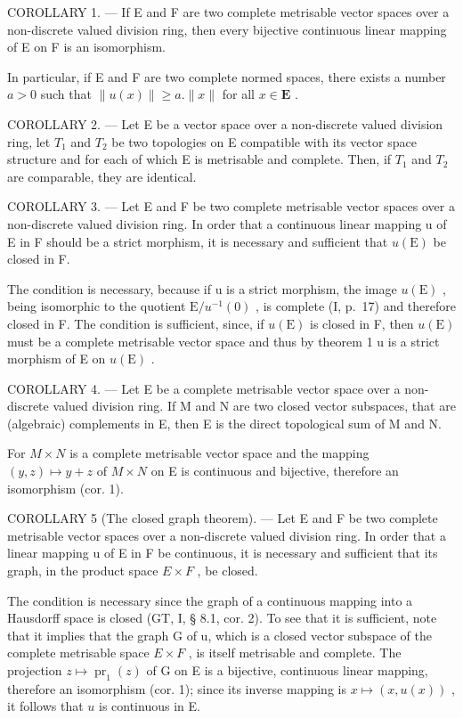COROLLARY 1. --- If E and F are two complete metrisable vector spaces over a non-discrete valued division ring, then every bijective continuous linear mapping of E on F is an isomorphism.

In particular, if E and F are two complete normed spaces, there exists a number \(a > 0\) such that \(\| u(x)\| \geqslant a.\| x\|\) for all \(x\in \mathbf{E}\) .

COROLLARY 2. --- Let E be a vector space over a non-discrete valued division ring, let \(T_{1}\) and \(T_{2}\) be two topologies on E compatible with its vector space structure and for each of which E is metrisable and complete. Then, if \(T_{1}\) and \(T_{2}\) are comparable, they are identical.

COROLLARY 3. --- Let E and F be two complete metrisable vector spaces over a non-discrete valued division ring. In order that a continuous linear mapping u of E in F should be a strict morphism, it is necessary and sufficient that \(u(\mathrm{E})\) be closed in F.

The condition is necessary, because if u is a strict morphism, the image \(u(\mathrm{E})\) , being isomorphic to the quotient \(\mathrm{E}/u^{-1}(0)\) , is complete (I, p.~17) and therefore closed in F. The condition is sufficient, since, if \(u(\mathrm{E})\) is closed in F, then \(u(\mathrm{E})\) must be a complete metrisable vector space and thus by theorem 1 u is a strict morphism of E on \(u(\mathrm{E})\) .

COROLLARY 4. --- Let E be a complete metrisable vector space over a non-discrete valued division ring. If M and N are two closed vector subspaces, that are (algebraic) complements in E, then E is the direct topological sum of M and N.

For \(M \times N\) is a complete metrisable vector space and the mapping \((y, z) \mapsto y + z\) of \(M \times N\) on E is continuous and bijective, therefore an isomorphism (cor. 1).

COROLLARY 5 (The closed graph theorem). --- Let E and F be two complete metrisable vector spaces over a non-discrete valued division ring. In order that a linear mapping u of E in F be continuous, it is necessary and sufficient that its graph, in the product space \(E \times F\) , be closed.

The condition is necessary since the graph of a continuous mapping into a Hausdorff space is closed (GT, I, § 8.1, cor. 2). To see that it is sufficient, note that it implies that the graph G of u, which is a closed vector subspace of the complete metrisable space \(E \times F\) , is itself metrisable and complete. The projection \(z \mapsto \operatorname{pr}_{1}(z)\) of G on E is a bijective, continuous linear mapping, therefore an isomorphism (cor. 1); since its inverse mapping is \(x \mapsto (x, u(x))\) , it follows that \(u\) is continuous in E.

